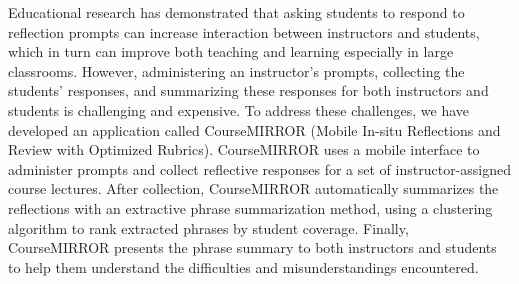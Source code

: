Educational research has demonstrated that asking students to respond to reflection prompts can increase interaction between instructors and students, which in turn can improve both teaching and learning especially in large classrooms. However, administering an instructor's prompts, collecting the students' responses, and summarizing these responses for both instructors and students is challenging and expensive. To address these challenges, we have developed an application called CourseMIRROR (Mobile In-situ Reflections and Review with Optimized Rubrics).  CourseMIRROR uses a mobile interface to administer prompts and collect reflective responses for a set of instructor-assigned course lectures. After collection, CourseMIRROR automatically summarizes the reflections with an extractive phrase summarization method, using a clustering algorithm to rank extracted phrases by student coverage. Finally, CourseMIRROR presents the phrase summary to both instructors and students to help them understand the difficulties and misunderstandings encountered.
